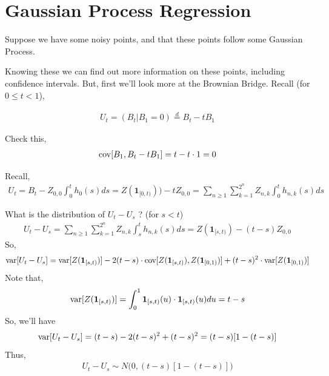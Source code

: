 \documentclass[../../../Master/AppliedStochastics.tex]{subfiles}
\begin{document}
\section{Gaussian Process Regression}
Suppose we have some noisy points, and that these points follow some Gaussian Process. 
\begin{center}
\end{center}
Knowing these we can find out more information on these points, including confidence intervals. 
But, first we'll look more at the Brownian Bridge. 
Recall (for $0\leq t < 1$), 

$$\begin{aligned}
U_{t} = (B_{t}\vert B_{1}=0) \stackrel{d}{=} B_{t} - tB_{1} 
\end{aligned}$$

Check this, 
$$\begin{aligned}
\operatorname{cov}[B_{1}, B_{t}-tB_{1}]= t - t\cdot 1 = 0 
\end{aligned}$$

Recall, 
$$\begin{aligned}
	U_{t}=B_{t}-Z_{0,0}\int_{0}^{t}h_{0}(s)ds=Z(\mathbf{1}_{[0,t)})) - tZ_{0,0} = \sum_{n\geq1}\sum_{k=1}^{2^n}Z_{n,k}\int_{0}^{t} h_{n,k}(s)ds
\end{aligned}$$

What is the distribution of $U_{t}-U_{s}$ ? (for $s<t$)
$$\begin{aligned}
	U_{t}-U_{s} = \sum_{n\geq1}\sum_{k=1}^{2^n} Z_{n,k}\int_{s}^{t} h_{n,k}(s)ds = Z(\mathbf{1}_{[s,t)})-(t-s)Z_{0,0}
\end{aligned}$$
So, 
$$\begin{aligned}
	\operatorname{var}[U_{t}-U_{s}] = \operatorname{var}[Z(\mathbf{1}_{[s,t)})]- 2(t-s)\cdot\operatorname{cov}[Z(\mathbf{1}_{[s,t)}),Z(\mathbf{1}_{[0,1)})] + (t-s)^2 \cdot \operatorname{var}[Z(\mathbf{1}_{[0,1)})]
\end{aligned}$$
Note that, 
$$\begin{aligned}
	\operatorname{var}[Z(\mathbf{1}_{[s,t)})] = \int_{0}^{1} \mathbf{1}_{[s,t)}(u) \cdot \mathbf{1}_{[s,t)}(u) du = t-s 
\end{aligned}$$
So, we'll have 
$$\begin{aligned}
	\operatorname{var}[U_{t}-U_{s}] = (t-s) - 2(t-s)^2 + (t-s)^2 = (t-s)[1-(t-s)]
\end{aligned}$$
Thus, 
$$\begin{aligned}
U_{t}-U_{s} \sim N\Big(0, (t-s)[1-(t-s)]\Big)
\end{aligned}$$
\end{document}
